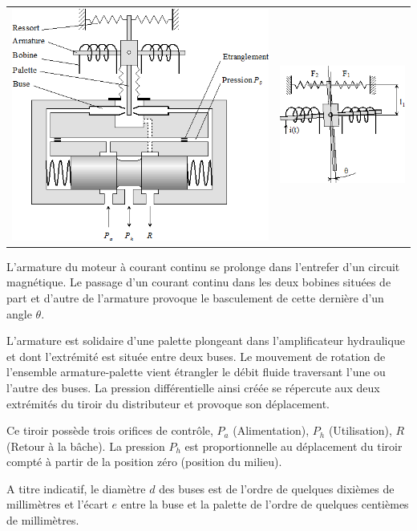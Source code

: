 \documentclass[10pt,fleqn]{article} %
\begin{document}
\begin{multicols}{2}
\begin{center}
\begin{tabular}{cc}
\includegraphics[width=.45\linewidth]{images/image6.png}&
\includegraphics[width=.45\linewidth]{images/image7.png}
\end{tabular}
\end{center}

L’armature du moteur à courant continu se prolonge dans l’entrefer d’un circuit magnétique. Le passage d’un courant continu dans les deux bobines situées de part et d’autre de l’armature provoque le basculement de cette dernière d’un angle $\theta$.

L’armature est solidaire d’une palette plongeant dans l’amplificateur hydraulique et dont l’extrémité est située entre deux buses. Le mouvement de rotation de l’ensemble armature-palette vient étrangler le débit fluide traversant l’une ou l’autre des buses. La pression différentielle ainsi créée se répercute aux deux extrémités du tiroir du distributeur et provoque son déplacement.

Ce tiroir possède trois orifices de contrôle, $P_a$ (Alimentation), $P_h$ (Utilisation), $R$ (Retour à la bâche). La pression $P_h$ est proportionnelle au déplacement du tiroir compté à partir de la position zéro (position du milieu).

A titre indicatif, le diamètre $d$ des buses est de l’ordre de quelques dixièmes de millimètres et l’écart $e$ entre la buse et la palette de l’ordre de quelques centièmes de millimètres.


\end{multicols}
\end{document}
